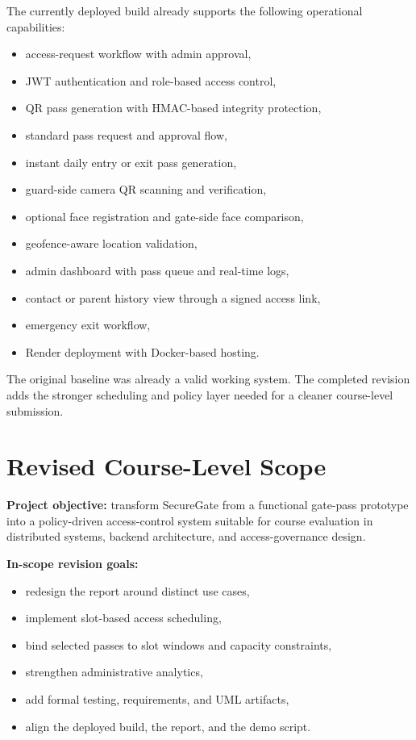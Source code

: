 \documentclass[12pt,letterpaper]{article}
\begin{document}
The currently deployed build already supports the following operational capabilities:
\begin{itemize}
    \item access-request workflow with admin approval,
    \item JWT authentication and role-based access control,
    \item QR pass generation with HMAC-based integrity protection,
    \item standard pass request and approval flow,
    \item instant daily entry or exit pass generation,
    \item guard-side camera QR scanning and verification,
    \item optional face registration and gate-side face comparison,
    \item geofence-aware location validation,
    \item admin dashboard with pass queue and real-time logs,
    \item contact or parent history view through a signed access link,
    \item emergency exit workflow,
    \item Render deployment with Docker-based hosting.
\end{itemize}

The original baseline was already a valid working system. The completed revision adds the stronger scheduling and policy layer needed for a cleaner course-level submission.

\section{Revised Course-Level Scope}

\textbf{Project objective:} transform SecureGate from a functional gate-pass prototype into a policy-driven access-control system suitable for course evaluation in distributed systems, backend architecture, and access-governance design.

\textbf{In-scope revision goals:}
\begin{itemize}
    \item redesign the report around distinct use cases,
    \item implement slot-based access scheduling,
    \item bind selected passes to slot windows and capacity constraints,
    \item strengthen administrative analytics,
    \item add formal testing, requirements, and UML artifacts,
    \item align the deployed build, the report, and the demo script.
\end{itemize}
\end{document}
